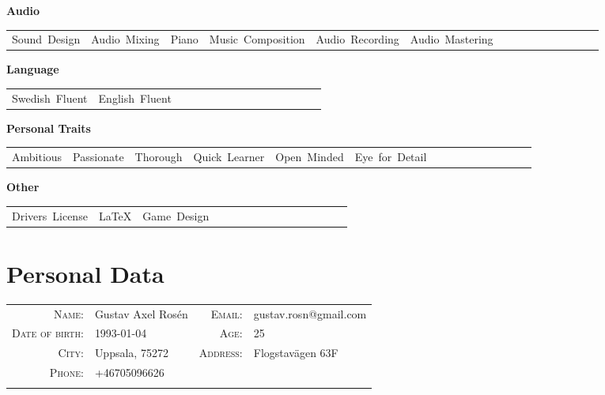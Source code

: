 \documentclass{article}
\newcommand{\pair}[2]{\textsc{\footnotesize{#1}} & \footnotesize{#2} }
\newcommand{\personal}[2]{\pair{#1:}{#2}}
\newcommand{\skill}[1]{\mbox{#1\hspace{1.2ex}}}
\newcommand{\cat}[1]{\vspace{2ex}

\noindent \textbf{#1} 

\begin{tabular}{lllllllllllllll}}
\newcommand{\catend}{\end{tabular}}
\begin{document}
\cat{Audio}%
\skill{Sound Design}&
\skill{Audio Mixing}&
\skill{Piano}&
\skill{Music Composition}&
\skill{Audio Recording}&
\skill{Audio Mastering}\\
\catend

\cat{Language}
\skill{Swedish Fluent}&
\skill{English Fluent}\\
\catend

\cat{Personal Traits}%
\skill{Ambitious}&
\skill{Passionate}&
\skill{Thorough}&
\skill{Quick Learner}&
\skill{Open Minded}&
\skill{Eye for Detail}\\
\catend

\cat{Other}%
\skill{Drivers License}&
\skill{\LaTeX}&
\skill{Game Design}\\
\catend

\section{Personal Data}
\begin{tabular}{rlrl}
\personal{Name}{Gustav Axel Rosén \hspace{9em}}&
\personal{Email}{gustav.rosn@gmail.com}\\
\personal{Date of birth}{1993-01-04}&
\personal{Age}{25}\\
\personal{City}{Uppsala, 75272}&
\personal{Address}{Flogstavägen 63F}\\
\personal{Phone}{+46705096626}\\
\par
\end{tabular}

\clearpage
\end{document}
